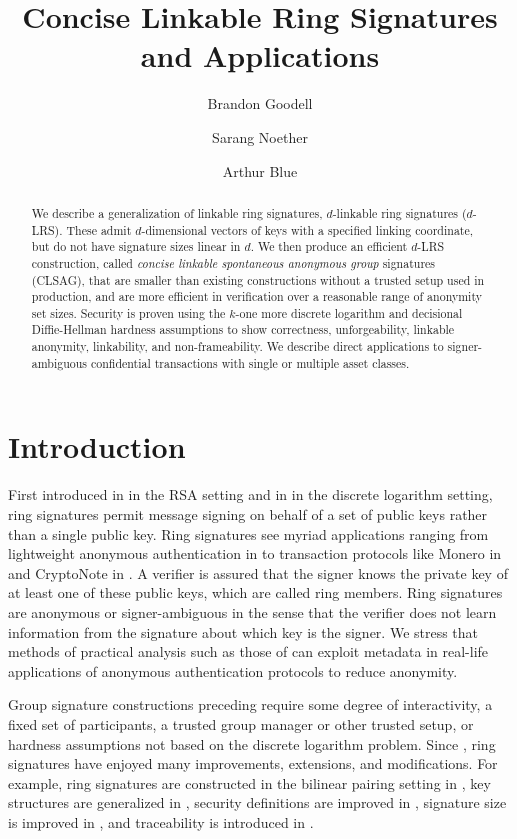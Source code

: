 \documentclass[draft]{llncs} %
\title{Concise Linkable Ring Signatures and Applications}
\institute{Monero Research Lab, \email{\{surae,sarang\}@getmonero.org} \and Independent researcher, \email{randomrun@protonmail.com}}
\author{Brandon Goodell\inst{1} \and Sarang Noether\inst{1} \and Arthur Blue\inst{2}}
\begin{document}
\maketitle


\begin{abstract}
We describe a generalization of linkable ring signatures, $d$-linkable ring signatures ($d$-LRS). These admit $d$-dimensional vectors of keys with a specified linking coordinate, but do not have signature sizes linear in $d$. We then produce an efficient $d$-LRS construction, called \textit{concise linkable spontaneous anonymous group} signatures (CLSAG), that are smaller than existing constructions without a trusted setup used in production, and are more efficient in verification over a reasonable range of anonymity set sizes. Security is proven using the $k$-one more discrete logarithm and decisional Diffie-Hellman hardness assumptions to show correctness, unforgeability, linkable anonymity, linkability, and non-frameability. We describe direct applications to signer-ambiguous confidential transactions with single or multiple asset classes.
\end{abstract}


\section{Introduction}

First introduced in \cite{rivest} in the RSA setting and in \cite{liu} in the discrete logarithm setting, ring signatures permit message signing on behalf of a set of public keys rather than a single public key. Ring signatures see myriad applications ranging from lightweight anonymous authentication in \cite{yang2015lightweight} to transaction protocols like Monero in \cite{noether} and CryptoNote in \cite{van2013cryptonote}. A verifier is assured that the signer knows the private key of at least one of these public keys, which are called ring members. Ring signatures are anonymous or signer-ambiguous in the sense that the verifier does not learn information from the signature about which key is the signer. We stress that methods of practical analysis such as those of  \cite{moser2018empirical,quesnelle2017linkability} can exploit metadata in real-life applications of anonymous authentication protocols to reduce anonymity.

Group signature constructions preceding \cite{rivest,liu} require some degree of interactivity, a fixed set of participants, a trusted group manager or other trusted setup, or hardness assumptions not based on the discrete logarithm problem. Since \cite{rivest}, ring signatures have enjoyed many improvements, extensions, and modifications. For example, ring signatures are constructed in the bilinear pairing setting in \cite{zhang2002id}, key structures are generalized in \cite{abe20021}, security definitions are improved in \cite{bender}, signature size is improved in \cite{fujisaki2011sub,gu2018constant}, and traceability is introduced in \cite{fujisaki2007traceable}.
\end{document}
